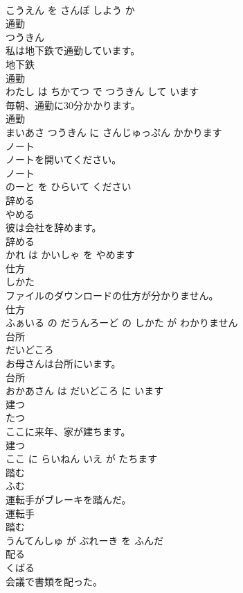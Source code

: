 \documentclass[8pt]{extreport}
\begin{document}
\begin{CJK}{UTF8}{min}
\\	こうえん を さんぽ しよう か			
\\	通勤	
\\	つうきん			
\\	私は地下鉄で通勤しています。	
\\	地下鉄 
\\	通勤 
\\	わたし は ちかてつ で つうきん して います			
\\	毎朝、通勤に30分かかります。	
\\	通勤 
\\	まいあさ つうきん に さんじゅっぷん かかります			
\\	ノート	
\\	ノートを開いてください。	
\\	ノート 
\\	のーと を ひらいて ください			
\\	辞める	
\\	やめる			
\\	彼は会社を辞めます。	
\\	辞める 
\\	かれ は かいしゃ を やめます			
\\	仕方	
\\	しかた			
\\	ファイルのダウンロードの仕方が分かりません。	
\\	仕方 
\\	ふぁいる の だうんろーど の しかた が わかりません			
\\	台所	
\\	だいどころ			
\\	お母さんは台所にいます。	
\\	台所 
\\	おかあさん は だいどころ に います			
\\	建つ	
\\	たつ			
\\	ここに来年、家が建ちます。	
\\	建つ 
\\	ここ に らいねん いえ が たちます			
\\	踏む	
\\	ふむ			
\\	運転手がブレーキを踏んだ。	
\\	運転手 
\\	踏む 
\\	うんてんしゅ が ぶれーき を ふんだ			
\\	配る	
\\	くばる			
\\	会議で書類を配った。	

\end{CJK}
\end{document}
